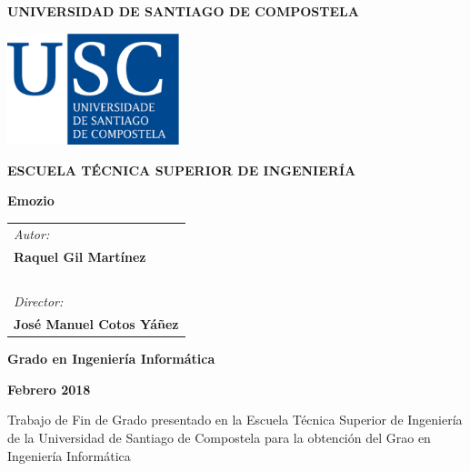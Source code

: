 \pagestyle{empty}
\begin{center}
{\bf\Large UNIVERSIDAD DE SANTIAGO DE COMPOSTELA}

\vspace{0.5cm}
\includegraphics[width=5cm]{figuras/logo_usc.eps}

\vspace{0.5cm}
{\bf\large ESCUELA TÉCNICA SUPERIOR DE INGENIERÍA}

\vspace{2cm}
{\bf\LARGE Emozio}

\vspace{0.5cm}
\end{center}

\vspace{2cm}
\hspace{4cm}\begin{tabular}{l}
{\it\Large Autor:} \\
{\bf\Large Raquel Gil Martínez} \\
~ \\
{\it\Large Director:} \\
{\bf\Large José Manuel Cotos Yáñez} \\
\end{tabular}

\vspace{2cm}
\begin{center}
{\bf\Large Grado en Ingeniería Informática}

\vspace{0.5cm}
{\bf\large Febrero 2018}

\vspace{0.5cm}
Trabajo de Fin de Grado presentado en la Escuela Técnica Superior de Ingeniería de la Universidad de Santiago de Compostela para la obtención del Grao en Ingeniería Informática
\end{center}

